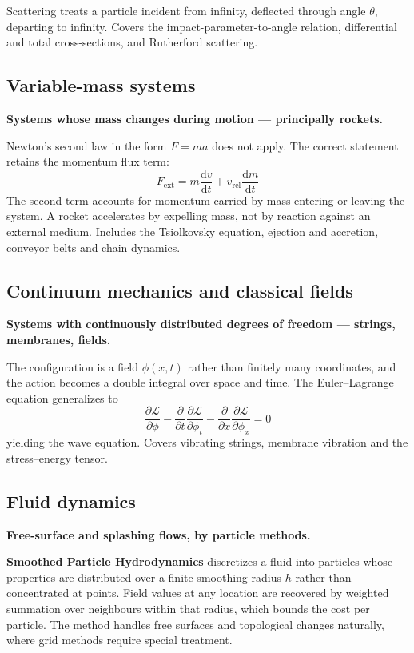 \documentclass[11pt,a4paper]{article}
\newcommand{\ud}{\mathrm{d}}
\newcommand{\dd}[2]{\frac{\partial #1}{\partial #2}}
\begin{document}
Scattering treats a particle incident from infinity, deflected through angle $\theta$, departing to
infinity. Covers the impact-parameter-to-angle relation, differential and total cross-sections, and
Rutherford scattering.

\subsection{Variable-mass systems}

\textbf{Systems whose mass changes during motion --- principally rockets.}

Newton's second law in the form $F = ma$ does not apply. The correct statement retains the momentum
flux term:
\begin{equation}
F_{\mathrm{ext}} = m\frac{\ud v}{\ud t} + v_{\mathrm{rel}}\frac{\ud m}{\ud t}
\end{equation}
The second term accounts for momentum carried by mass entering or leaving the system. A rocket
accelerates by expelling mass, not by reaction against an external medium. Includes the Tsiolkovsky
equation, ejection and accretion, conveyor belts and chain dynamics.

\subsection{Continuum mechanics and classical fields}

\textbf{Systems with continuously distributed degrees of freedom --- strings, membranes, fields.}

The configuration is a field $\phi(x, t)$ rather than finitely many coordinates, and the action
becomes a double integral over space and time. The Euler--Lagrange equation generalizes to
\begin{equation}
\dd{\mathcal{L}}{\phi}
  - \frac{\partial}{\partial t}\dd{\mathcal{L}}{\phi_t}
  - \frac{\partial}{\partial x}\dd{\mathcal{L}}{\phi_x} = 0
\end{equation}
yielding the wave equation. Covers vibrating strings, membrane vibration and the stress--energy
tensor.

\subsection{Fluid dynamics}

\textbf{Free-surface and splashing flows, by particle methods.}

\textbf{Smoothed Particle Hydrodynamics} discretizes a fluid into particles whose properties are
distributed over a finite smoothing radius $h$ rather than concentrated at points. Field values at
any location are recovered by weighted summation over neighbours within that radius, which bounds the
cost per particle. The method handles free surfaces and topological changes naturally, where grid
methods require special treatment.
\end{document}
